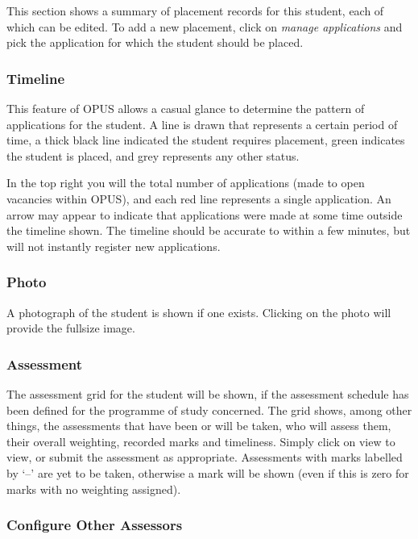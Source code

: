 \documentclass[12 pt]{book}
\begin{document}
This section shows a summary of placement records for this student, each of
which can be edited. To add a new placement, click on \emph{manage applications}
and pick the application for which the student should be placed.

\subsubsection{Timeline}

This feature of OPUS allows a casual glance to determine the pattern of
applications for the student. A line is drawn that represents a certain
period of time, a thick black line indicated the student requires placement,
green indicates the student is placed, and grey represents any other 
status.

In the top right you will the total number of applications (made to open
vacancies within OPUS), and each red line represents a single application. An
arrow may appear to indicate that applications were made at some time outside
the timeline shown. The timeline should be accurate to within a few minutes,
but will not instantly register new applications.

\subsubsection{Photo}

A photograph of the student is shown if one exists. Clicking on the photo will
provide the fullsize image.

\subsubsection{Assessment}

The assessment grid for the student will be shown, if the assessment schedule
has been defined for the programme of study concerned. The grid shows, among
other things, the assessments that have been or will be taken, who will assess
them, their overall weighting, recorded marks and timeliness. Simply click on
view to view, or submit the assessment as appropriate. Assessments with marks
labelled by `--' are yet to be taken, otherwise a mark will be shown (even if
this is zero for marks with no weighting assigned).

\subsubsection{Configure Other Assessors}
\end{document}

